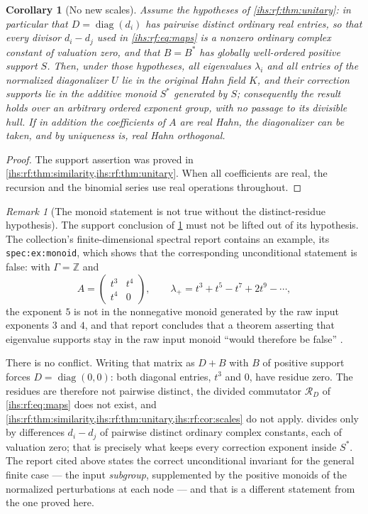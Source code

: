 \documentclass[11pt,a4paper]{article}
\numberwithin{equation}{section}
\newtheorem{corollary}[corollary]{Corollary}
\theoremstyle{definition}
\theoremstyle{remark}
\newtheorem{remark}[remark]{Remark}
\newcommand{\Z}{\mathbb Z}
\newcommand{\K}{K}
\newcommand{\diag}{\operatorname{diag}}
\begin{document}
\begin{corollary}[No new scales]\label{ihs:rf:cor:scales}
Assume the hypotheses of \cref{ihs:rf:thm:unitary}: in particular that
$D=\diag(d_i)$ has \emph{pairwise distinct ordinary real} entries, so that
every divisor $d_i-d_j$ used in \eqref{ihs:rf:eq:maps} is a nonzero ordinary
complex constant of valuation zero, and that $B=B^*$ has globally
well-ordered positive support $S$. Then, under those hypotheses, all
eigenvalues $\lambda_i$ and all entries of the normalized diagonalizer $U$
lie in the original Hahn field $\K$, and their correction supports lie in
the additive monoid $S^*$ generated by $S$; consequently the result holds
over an arbitrary ordered exponent group, with no passage to its divisible
hull. If in addition the coefficients of $A$ are real Hahn, the
diagonalizer can be taken, and by uniqueness is, real Hahn orthogonal.
\end{corollary}
\begin{proof}
The support assertion was proved in
\cref{ihs:rf:thm:similarity,ihs:rf:thm:unitary}. When all coefficients are
real, the recursion and the binomial series use real operations throughout.
\end{proof}

\begin{remark}[The monoid statement is not true without the distinct-residue hypothesis]\label{ihs:rf:rem:monoid}
The support conclusion of \cref{ihs:rf:cor:scales} must not be lifted out of
its hypothesis. The collection's finite-dimensional spectral report contains
an example, its \texttt{spec:ex:monoid}, which shows that the corresponding
unconditional statement is false: with $\Gamma=\Z$ and
\[
 A=\begin{pmatrix}t^3&t^4\\t^4&0\end{pmatrix},
 \qquad
 \lambda_+=t^3+t^5-t^7+2t^9-\cdots,
\]
the exponent $5$ is not in the nonnegative monoid generated by the raw input
exponents $3$ and $4$, and that report concludes that a theorem asserting
that eigenvalue supports stay in the raw input monoid ``would therefore be
false'' \cite{RepoSpectral}.

There is no conflict. Writing that matrix as $D+B$ with $B$ of positive
support forces $D=\diag(0,0)$: both diagonal entries, $t^3$ and $0$, have
residue zero. The residues are therefore not pairwise distinct, the divided
commutator $\mathcal R_D$ of \eqref{ihs:rf:eq:maps} does not exist, and
\cref{ihs:rf:thm:similarity,ihs:rf:thm:unitary,ihs:rf:cor:scales} do not
apply.  divides only by differences $d_i-d_j$ of
pairwise distinct ordinary complex constants, each of valuation zero; that
is precisely what keeps every correction exponent inside $S^*$. The report
cited above states the correct unconditional invariant for the general
finite case --- the input \emph{subgroup}, supplemented by the positive
monoids of the normalized perturbations at each node --- and that is a
different statement from the one proved here.
\end{remark}
\end{document}
